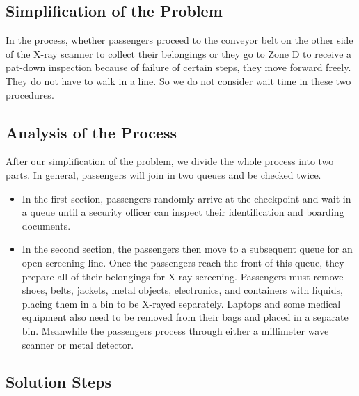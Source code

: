 \documentclass{mcmthesis}
\begin{document}
\subsection{Simplification of the Problem}

\par In the process, whether passengers proceed to the conveyor belt on the other side of the X-ray scanner to collect their belongings or they go to Zone D to receive a pat-down inspection because of failure of certain steps, they move forward freely. They do not have to walk in a line. So we do not consider wait time in these two procedures.

\subsection{Analysis of the Process}
\par After our simplification of the problem, we divide the whole process into two parts. In general, passengers will join in two queues and be checked twice.

\begin{itemize}
	\item In the first section, passengers randomly arrive at the checkpoint and wait in a queue until a security officer can inspect their identification and boarding documents.
	\item In the second section, the passengers then move to a subsequent queue for an open screening line. Once the passengers reach the front of this queue, they prepare all of their belongings for X-ray screening. Passengers must remove shoes, belts, jackets, metal objects, electronics, and containers with liquids, placing them in a bin to be X-rayed separately. Laptops and some medical equipment also need to be removed from their bags and placed in a separate bin. Meanwhile the passengers process through either a millimeter wave scanner or metal detector.  
\end{itemize}

\subsection{Solution Steps}
\end{document}
